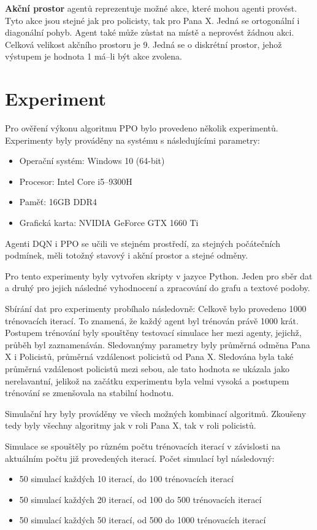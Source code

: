 \bigskip

\textbf{Akční prostor} agentů reprezentuje možné akce, které mohou agenti provést.
Tyto akce jsou stejné jak pro policisty, tak pro Pana X\@.
Jedná se ortogonální i diagonální pohyb.
Agent také může zůstat na místě a neprovést žádnou akci.
Celková velikost akčního prostoru je 9.
Jedná se o diskrétní prostor, jehož výstupem je hodnota 1 má--li být akce zvolena.

\chapter{Experiment}
\label{ch:experiment}

Pro ověření výkonu algoritmu PPO bylo provedeno několik experimentů.
Experimenty byly prováděny na systému s následujícími parametry:

\begin{itemize}
  \item Operační systém: Windows 10 (64-bit)
  \item Procesor: Intel Core i5--9300H
  \item Paměť: 16GB DDR4
  \item Grafická karta: NVIDIA GeForce GTX 1660 Ti
\end{itemize}

Agenti DQN i PPO se učili ve stejném prostředí, za stejných počátečních podmínek, měli totožný stavový i akční prostor a stejné odměny.

Pro tento experimenty byly vytvořen skripty v jazyce Python.
Jeden pro sběr dat a druhý pro jejich následné vyhodnocení a zpracování do grafu a textové podoby.

Sbírání dat pro experimenty probíhalo následovně:
Celkově bylo provedeno 1000 trénovacích iterací.
To znamená, že každý agent byl trénován právě 1000 krát.
Postupem trénování byly spouštěny testovací simulace her mezi agenty, jejichž, průběh byl zaznamenáván.
Sledovanýmy parametry byly průměrná odměna Pana X i Policistů, průměrná vzdálenost policistů od Pana X.
Sledována byla také průměrná vzdálenost policistů mezi sebou, ale tato hodnota se ukázala jako nerelavantní, jelikož na začátku experimentu byla velmi vysoká a postupem trénování se zmenšovala na stabilní hodnotu.

Simulační hry byly prováděny ve všech možných kombinací algoritmů.
Zkoušeny tedy byly všechny algoritmy jak v roli Pana X, tak v roli policistů.

Simulace se spouštěly po různém počtu trénovacích iterací v závislosti na aktuálním počtu již provedených iterací.
Počet simulací byl následovný:
\begin{itemize}
  \item 50 simulací každých 10 iterací, do 100 trénovacích iterací
  \item 50 simulací každých 20 iterací, od 100 do 500 trénovacích iterací
  \item 50 simulací každých 50 iterací, od 500 do 1000 trénovacích iterací
\end{itemize}

